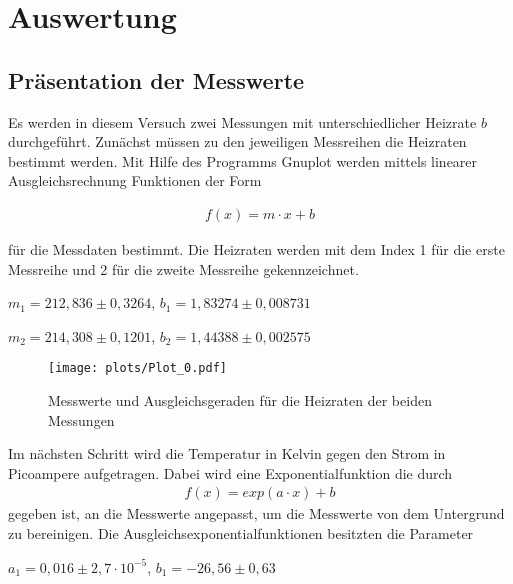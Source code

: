 \section{Auswertung}
\label{sec:Auswertung}


 \subsection{Präsentation der Messwerte}



Es werden in diesem Versuch zwei Messungen mit unterschiedlicher Heizrate
$b$ durchgeführt. Zunächst müssen zu den jeweiligen Messreihen die Heizraten bestimmt werden.
Mit Hilfe des Programms Gnuplot werden mittels linearer Ausgleichsrechnung Funktionen der Form

\begin{align}
f(x)=m\cdot x+b
\label{ausgleichsfunktion1}
\end{align}

für die Messdaten bestimmt. Die Heizraten werden mit dem Index 1 für die erste Messreihe und 2 für die zweite Messreihe gekennzeichnet.

\begin{center}
$m_1= 212,836 \pm 0,3264$, $b_1=1,83274 \pm 0,008731$
\end{center}

\begin{center}
$m_2= 214,308 \pm0,1201 $, $b_2= 1,44388 \pm 0,002575$
\end{center}

\begin{figure}
  \centering
  \texttt{[image: plots/Plot\_0.pdf]}
  \caption{Messwerte und Ausgleichsgeraden für die Heizraten der beiden Messungen}
  \label{fig:plot0}
\end{figure}

Im nächsten Schritt wird die Temperatur in Kelvin gegen den Strom in Picoampere aufgetragen. Dabei wird eine Exponentialfunktion die durch
\begin{align}
f(x)=exp(a\cdot x)+b
\label{exponentialfunktion1}
\end{align}
 gegeben ist, an die Messwerte angepasst, um die Messwerte von dem Untergrund zu bereinigen. Die Ausgleichsexponentialfunktionen besitzten die Parameter

 \begin{center}
$a_1=0,016 \pm 2,7 \cdot 10^{-5}$, $b_1=-26,56 \pm 0,63$
\end{center}


